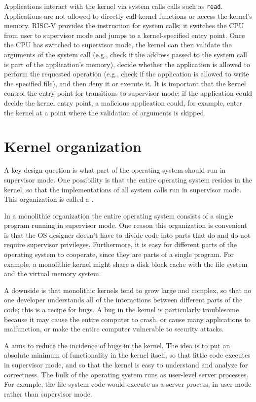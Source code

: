 Applications interact with the kernel via system calls
calls such as {\tt read}.
Applications are not allowed to directly call kernel functions
or access the kernel's memory.
RISC-V provides the  instruction
for system calls; it switches the CPU from user to supervisor mode
and jumps to a kernel-specified entry point.
Once the CPU has switched to supervisor mode,
the kernel can then validate the arguments of the system call (e.g.,
check if the address passed to the system call is part of the application's memory), decide whether
the application is allowed to perform the requested operation (e.g.,
check if the application is allowed to write the specified file), and then deny it
or execute it.  It is important that the kernel control the entry point for
transitions to supervisor mode; if the application could decide the kernel entry
point, a malicious application could, for example, enter the kernel at a point where the
validation of arguments is skipped.

\section{Kernel organization}

A key design question is what part of the operating
system should run in supervisor mode.
One possibility is that the entire operating system resides
in the kernel, so that the implementations of all system calls
run in supervisor mode.
This organization is called a
.

In a monolithic organization the entire operating system consists of a single
program running in supervisor mode.
One reason this organization is convenient is that the OS designer
doesn't have to divide code into parts that do and do not
require supervisor privileges.
Furthermore, it is easy for different parts of the operating system to
cooperate, since they are parts of a single program.
For example, a monolithic kernel might share a disk block cache
with the file system and the virtual memory system.

A downside is that monolithic kernels tend to grow large
and complex, so that no one developer understands all of
the interactions between different parts of the code;
this is a recipe for bugs. A bug in the kernel is particularly
troublesome because it may cause the entire computer to crash,
or cause many applications to malfunction,
or make the entire computer vulnerable to security attacks.

A  aims to reduce the incidence of bugs in the
kernel. The idea is to put an absolute minimum of functionality in the
kernel itself, so that little code executes in supervisor mode, and so
that the kernel is easy to understand and analyze for correctness. The
bulk of the operating system runs as user-level server processes. For
example, the file system code would execute as a server process, in
user mode rather than supervisor mode.

